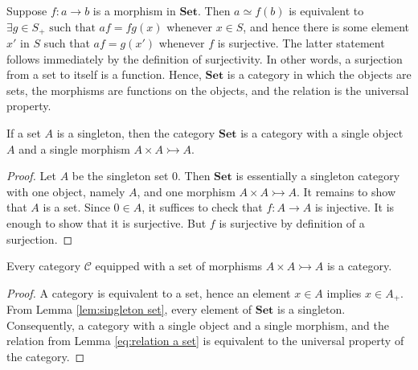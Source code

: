 \documentclass[a4paper,reqno,oneside]{article}
\begin{document}
Suppose $f : a \to b$ is a morphism in $\mathbf{Set}$. Then $a \simeq f(b)$ is equivalent to $\exists g \in S_{+} \text{ such that } af = fg(x)$ whenever $x \in S$, and hence there is some element $x'$ in $S$ such that $af = g(x')$ whenever $f$ is surjective. The latter statement follows immediately by the definition of surjectivity. In other words, a surjection from a set to itself is a function. Hence, $\mathbf{Set}$ is a category in which the objects are sets, the morphisms are functions on the objects, and the relation is the universal property.

\begin{lemma}
    If a set $A$ is a singleton, then the category $\mathbf{Set}$ is a category with a single object $A$ and a single morphism $A \times A \rightarrowtail A$.
\end{lemma}

\begin{proof}
    Let $A$ be the singleton set $0$. Then $\mathbf{Set}$ is essentially a singleton category with one object, namely $A$, and one morphism $A \times A \rightarrowtail A$. It remains to show that $A$ is a set. Since $0 \in A$, it suffices to check that $f : A \to A$ is injective. It is enough to show that it is surjective. But $f$ is surjective by definition of a surjection.
\end{proof}

\begin{lemma}
    Every category $\mathcal{C}$ equipped with a set of morphisms $A \times A \rightarrowtail A$ is a category.
\end{lemma}

\begin{proof}
    A category is equivalent to a set, hence an element $x \in A$ implies $x \in A_{+}$. From Lemma \ref{lem:singleton set}, every element of $\mathbf{Set}$ is a singleton. Consequently, a category with a single object and a single morphism, and the relation from Lemma \ref{eq:relation a set} is equivalent to the universal property of the category.
\end{proof}
\end{document}
